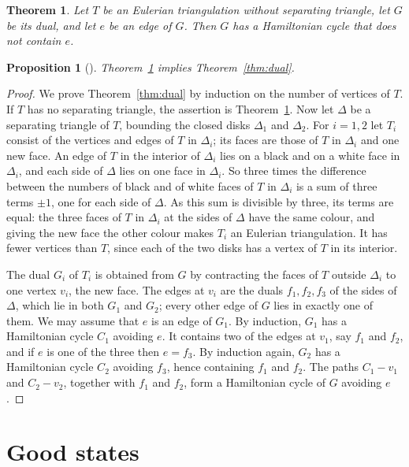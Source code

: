 \documentclass[a4paper]{amsart}
\numberwithin{equation}{section}
\newtheorem{theorem}[equation]{Theorem}
\newtheorem{proposition}[equation]{Proposition}
\theoremstyle{definition}
\begin{document}
\begin{theorem}\label{thm:nosep}
Let $T$ be an Eulerian triangulation without separating triangle, let $G$ be its dual, and let $e$ be an edge of $G$.
Then $G$ has a Hamiltonian cycle that does not contain $e$.
\end{theorem}

\begin{proposition}[{\cite[Theorem~3]{Li}}]\label{prop:reduction}
Theorem~\ref{thm:nosep} implies Theorem~\ref{thm:dual}.
\end{proposition}

\begin{proof}
We prove Theorem~\ref{thm:dual} by induction on the number of vertices of $T$.
If $T$ has no separating triangle, the assertion is Theorem~\ref{thm:nosep}.
Now let $\Delta$ be a separating triangle of $T$, bounding the closed disks $\Delta_1$ and $\Delta_2$.
For $i=1,2$ let $T_i$ consist of the vertices and edges of $T$ in $\Delta_i$; its faces are those of $T$ in $\Delta_i$ and one new face.
An edge of $T$ in the interior of $\Delta_i$ lies on a black and on a white face in $\Delta_i$, and each side of $\Delta$ lies on one face in $\Delta_i$.
So three times the difference between the numbers of black and of white faces of $T$ in $\Delta_i$ is a sum of three terms $\pm1$, one for each side of $\Delta$.
As this sum is divisible by three, its terms are equal: the three faces of $T$ in $\Delta_i$ at the sides of $\Delta$ have the same colour, and giving the new face the other colour makes $T_i$ an Eulerian triangulation.
It has fewer vertices than $T$, since each of the two disks has a vertex of $T$ in its interior.

The dual $G_i$ of $T_i$ is obtained from $G$ by contracting the faces of $T$ outside $\Delta_i$ to one vertex $v_i$, the new face.
The edges at $v_i$ are the duals $f_1,f_2,f_3$ of the sides of $\Delta$, which lie in both $G_1$ and $G_2$; every other edge of $G$ lies in exactly one of them.
We may assume that $e$ is an edge of $G_1$.
By induction, $G_1$ has a Hamiltonian cycle $C_1$ avoiding $e$.
It contains two of the edges at $v_1$, say $f_1$ and $f_2$, and if $e$ is one of the three then $e=f_3$.
By induction again, $G_2$ has a Hamiltonian cycle $C_2$ avoiding $f_3$, hence containing $f_1$ and $f_2$.
The paths $C_1-v_1$ and $C_2-v_2$, together with $f_1$ and $f_2$, form a Hamiltonian cycle of $G$ avoiding $e$.
\end{proof}

\section{Good states}\label{sec:states}
\end{document}
